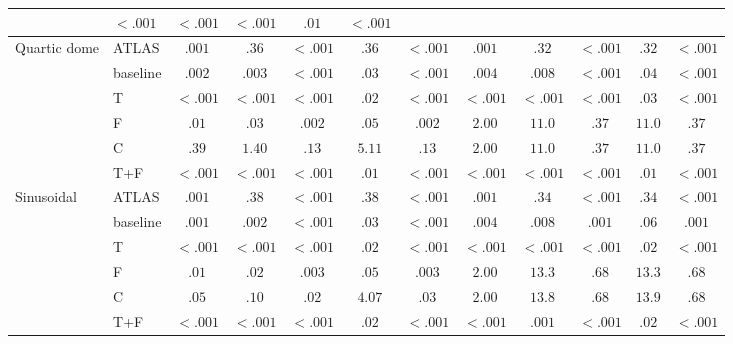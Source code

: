 \documentclass[11pt]{article}
\begin{document}
\begin{table}[ht]
\begin{tabular}{ll ccccc ccccc}
            & $<.001$ & $<.001$ & $<.001$ & $\mathbf{.01}$  & $<.001$ \\
\midrule
Quartic dome
 & ATLAS    & $.001$ & $.36$  & $<.001$ & $.36$  & $<.001$
            & $.001$ & $.32$  & $<.001$ & $.32$  & $<.001$ \\
 & baseline & $.002$ & $.003$ & $<.001$ & $.03$  & $<.001$
            & $.004$ & $.008$ & $<.001$ & $.04$  & $<.001$ \\
 & T        & $\mathbf{<.001}$ & $\mathbf{<.001}$ & $<.001$ & $.02$  & $<.001$
            & $\mathbf{<.001}$ & $\mathbf{<.001}$ & $<.001$ & $.03$  & $<.001$ \\
 & F        & $.01$  & $.03$  & $.002$ & $.05$  & $.002$
            & $2.00$ & $11.0$ & $.37$  & $11.0$ & $.37$ \\
 & C        & $.39$  & $1.40$ & $.13$  & $5.11$ & $.13$
            & $2.00$ & $11.0$ & $.37$  & $11.0$ & $.37$ \\
 & T+F      & $<.001$ & $<.001$ & $<.001$ & $\mathbf{.01}$  & $<.001$
            & $<.001$ & $<.001$ & $<.001$ & $\mathbf{.01}$  & $<.001$ \\
\midrule
Sinusoidal
 & ATLAS    & $.001$ & $.38$  & $<.001$ & $.38$  & $<.001$
            & $.001$ & $.34$  & $<.001$ & $.34$  & $<.001$ \\
 & baseline & $.001$ & $.002$ & $<.001$ & $.03$  & $<.001$
            & $.004$ & $.008$ & $.001$ & $.06$  & $.001$ \\
 & T        & $\mathbf{<.001}$ & $\mathbf{<.001}$ & $<.001$ & $.02$  & $<.001$
            & $\mathbf{<.001}$ & $\mathbf{<.001}$ & $<.001$ & $.02$  & $<.001$ \\
 & F        & $.01$  & $.02$  & $.003$ & $.05$  & $.003$
            & $2.00$ & $13.3$ & $.68$  & $13.3$ & $.68$ \\
 & C        & $.05$  & $.10$  & $.02$  & $4.07$ & $.03$
            & $2.00$ & $13.8$ & $.68$  & $13.9$ & $.68$ \\
 & T+F      & $<.001$ & $<.001$ & $<.001$ & $\mathbf{.02}$  & $<.001$
            & $<.001$ & $.001$ & $<.001$ & $\mathbf{.02}$  & $<.001$ \\
\bottomrule
\end{tabular}
\end{table}




\end{document}
